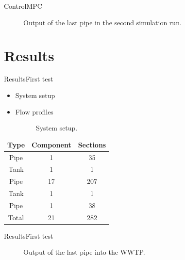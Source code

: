 \begin{frame}{Control}{MPC}
 \begin{figure}[H]
 \centering
 
\caption{Output of the last pipe in the second simulation run.}
\label{fig:MPC_test_output_second_test_with_constraints}
\end{figure}   


\end{frame}



\section{Results}

\begin{frame}{Results}{First test}
\begin{minipage}[t]{0.48\linewidth}
\begin{itemize}
	   	\item System setup
	   	\item Flow profiles 
\end{itemize}    
\end{minipage}\hfill
\begin{minipage}[t]{0.48\linewidth}
\begin{table}[H]
\centering
\begin{tabular}{|c|c|c|}
\hline
	\rowcolor[HTML]{9B9B9B} 
Type  & Component & Sections \\ \hline
Pipe  & 1         & 35       \\ \hline
Tank  & 1         & 1        \\ \hline
Pipe  & 17        & 207      \\ \hline
Tank  & 1         & 1        \\ \hline
Pipe  & 1         & 38        \\ \hline
Total & 21        & 282      \\ \hline
\end{tabular}
\caption{System setup.}
\label{tab:system_setup_nonlinear_linear_testv2}
\end{table}
\end{minipage}



\end{frame}

\begin{frame}{Results}{First test}
 \begin{figure}[H]
\centering

\caption{Output of the last pipe into the WWTP.}
\label{fig:simulation_output_first}
\end{figure}     
\end{frame}

